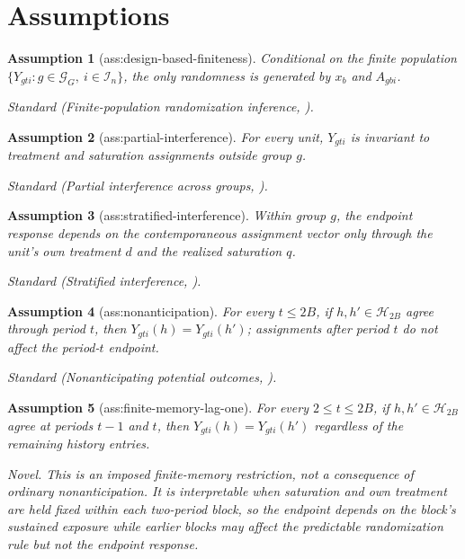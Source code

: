 \documentclass{article}
\newtheorem{assumption}{Assumption}
\begin{document}
\section{Assumptions}

\begin{assumption}[ass:design-based-finiteness]\label{ass:design-based-finiteness}
Conditional on the finite population \(\{Y_{gti}:g\in\mathcal G_G,\ i\in\mathcal I_n\}\), the only randomness is generated by \(x_b\) and \(A_{gbi}\).
\par\smallskip\noindent\emph{Standard} (Finite-population randomization inference, \cite{LiDing2017FPCLT}).
\end{assumption}

\begin{assumption}[ass:partial-interference]\label{ass:partial-interference}
For every unit, \(Y_{gti}\) is invariant to treatment and saturation assignments outside group \(g\).
\par\smallskip\noindent\emph{Standard} (Partial interference across groups, \cite{HudgensHalloran2008}).
\end{assumption}

\begin{assumption}[ass:stratified-interference]\label{ass:stratified-interference}
Within group \(g\), the endpoint response depends on the contemporaneous assignment vector only through the unit's own treatment \(d\) and the realized saturation \(q\).
\par\smallskip\noindent\emph{Standard} (Stratified interference, \cite{HudgensHalloran2008}).
\end{assumption}

\begin{assumption}[ass:nonanticipation]\label{ass:nonanticipation}
For every \(t\leq2B\), if \(h,h'\in\mathcal H_{2B}\) agree through period \(t\), then \(Y_{gti}(h)=Y_{gti}(h')\); assignments after period \(t\) do not affect the period-\(t\) endpoint.
\par\smallskip\noindent\emph{Standard} (Nonanticipating potential outcomes, \cite{BojinovRambachanShephard2021}).
\end{assumption}

\begin{assumption}[ass:finite-memory-lag-one]\label{ass:finite-memory-lag-one}
For every \(2\leq t\leq2B\), if \(h,h'\in\mathcal H_{2B}\) agree at periods \(t-1\) and \(t\), then \(Y_{gti}(h)=Y_{gti}(h')\) regardless of the remaining history entries.
\par\smallskip\noindent\emph{Novel.} This is an imposed finite-memory restriction, not a consequence of ordinary nonanticipation. It is interpretable when saturation and own treatment are held fixed within each two-period block, so the endpoint depends on the block's sustained exposure while earlier blocks may affect the predictable randomization rule but not the endpoint response.
\end{assumption}
\end{document}
